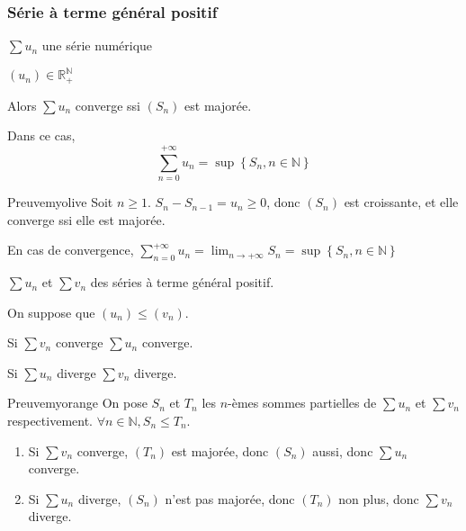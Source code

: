         \subsubsection{Série à terme général positif}
    
    \begin{prop}{}{}
        \begin{soient}
            \item $\sum u_n$ une série numérique
            \item $(u_n) \in \mathbb{R}_+^{\mathbb{N}}$
        \end{soient}
        Alors $\sum u_n$ converge ssi $(S_n)$ est majorée. 

        Dans ce cas, 
        \[ \sum_{n=0}^{+\infty} u_n = \sup\left\{ S_n, n \in \mathbb{N} \right\} \] 
    \end{prop}

    \begin{demo}{Preuve}{myolive}
        Soit $n \geq 1$. $S_n - S_{n-1} = u_n \geq 0$, donc $(S_n)$ est croissante, et elle converge ssi elle est majorée.

        En cas de convergence, $\sum_{n=0}^{+\infty} u_n = \lim_{n \rightarrow +\infty}S_n = \sup\left\{ S_n, n \in \mathbb{N} \right\}$
    \end{demo}

    \begin{coro}{}{}
        \begin{soient}
            \item $\sum u_n$ et $\sum v_n$ des séries à terme général positif.
        \end{soient}
        On suppose que $(u_n) \leq (v_n)$.

        \begin{alors}
            \item Si $\sum v_n$ converge $\sum u_n$ converge.
            \item Si $\sum u_n$ diverge $\sum v_n$ diverge.
        \end{alors}
    \end{coro}

    \begin{demo}{Preuve}{myorange}
        On pose $S_n$ et $T_n$ les $n$-èmes sommes partielles de $\sum u_n$ et $\sum v_n$ respectivement. $\forall n \in \mathbb{N}, S_n \leq T_n$.
        \begin{enumerate}
            \item Si $\sum v_n$ converge, $(T_n)$ est majorée, donc $(S_n)$ aussi, donc $\sum u_n$ converge.
            \item Si $\sum u_n$ diverge, $(S_n)$ n’est pas majorée, donc $(T_n)$ non plus, donc $\sum v_n$ diverge.
        \end{enumerate}
    \end{demo}

